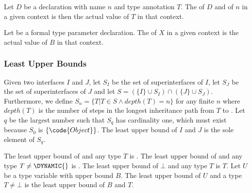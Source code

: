 \documentclass[makeidx]{article}
\begin{document}
{\LMHash{}%
Let $D$ be a declaration with name $n$ and type annotation $T$.
The  of $D$ and of $n$ in a given context is
then the actual value of $T$ in that context.


\LMHash{}%
Let  be a formal type parameter declaration.
The  of $X$ in a given context is
the actual value of $B$ in that context.



\subsubsection{Least Upper Bounds}


\LMHash{}%
Given two interfaces $I$ and $J$,
let $S_I$ be the set of superinterfaces of $I$,
let $S_J$ be the set of superinterfaces of $J$
and let $S = (\{I\} \cup S_I) \cap (\{J\} \cup S_J)$.
Furthermore,
we define $S_n = \{T | T \in S \wedge depth(T) = n\}$ for any finite $n$
where $depth(T)$ is the number of steps in the longest inheritance path
from $T$ to .
Let $q$ be the largest number such that $S_q$ has cardinality one,
which must exist because $S_0$ is $\{\code{Object}\}$.
The least upper bound of $I$ and $J$ is the sole element of $S_q$.

\LMHash{}%
The least upper bound of \DYNAMIC{} and any type $T$ is \DYNAMIC{}.
The least upper bound of \VOID{} and any type $T \ne \DYNAMIC{}$ is \VOID{}.
The least upper bound of $\bot$ and any type $T$ is $T$.
Let $U$ be a type variable with upper bound $B$.
The least upper bound of $U$ and a type $T \ne \bot$ is the least upper bound of $B$ and $T$.

}
\end{document}
